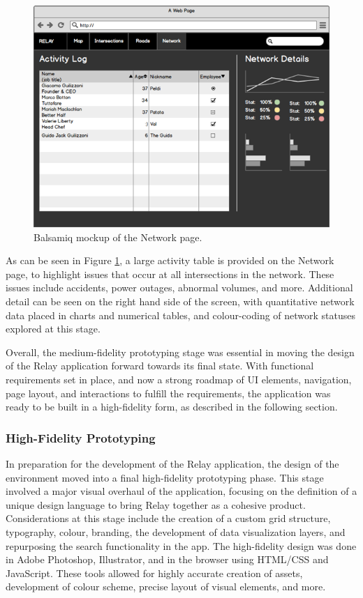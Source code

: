 \documentclass{report}
\begin{document}
\begin{figure}[htbp!]
  \begin{centering}
    \includegraphics[scale=0.6]{figures/bals-5.png}
    \caption{Balsamiq mockup of the Network page.}
    \label{fig:bals-5}
  \end{centering}
\end{figure}

As can be seen in Figure \ref{fig:bals-5}, a large activity table is provided on the Network page, to highlight issues that occur at all intersections in the network.
These issues include accidents, power outages, abnormal volumes, and more.
Additional detail can be seen on the right hand side of the screen, with quantitative network data placed in charts and numerical tables, and colour-coding of network statuses explored at this stage.

Overall, the medium-fidelity prototyping stage was essential in moving the design of the Relay application forward towards its final state.
With functional requirements set in place, and now a strong roadmap of UI elements, navigation, page layout, and interactions to fulfill the requirements, the application was ready to be built in a high-fidelity form, as described in the following section.

\subsubsection{High-Fidelity Prototyping}
In preparation for the development of the Relay application, the design of the environment moved into a final high-fidelity prototyping phase.
This stage involved a major visual overhaul of the application, focusing on the definition of a unique design language to bring Relay together as a cohesive product.
Considerations at this stage include the creation of a custom grid structure, typography, colour, branding, the development of data visualization layers, and repurposing the search functionality in the app.
The high-fidelity design was done in Adobe Photoshop, Illustrator, and in the browser using HTML/CSS and JavaScript.
These tools allowed for highly accurate creation of assets, development of colour scheme, precise layout of visual elements, and more.
\end{document}
